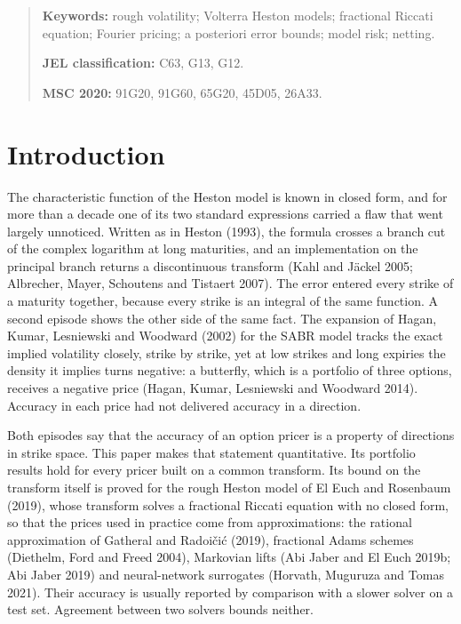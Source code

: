 \documentclass[11pt,a4paper]{article}
\begin{document}
\vspace{0.4em}

\begin{quote}\small\noindent\textbf{Keywords:} rough volatility; Volterra Heston models; fractional Riccati equation; Fourier pricing; a posteriori error bounds; model risk; netting.\par\smallskip\noindent\textbf{JEL classification:} C63, G13, G12.\par\smallskip\noindent\textbf{MSC 2020:} 91G20, 91G60, 65G20, 45D05, 26A33.\end{quote}

\newpage

\setcounter{footnote}{0}

\setcounter{section}{0}\section{Introduction}

The characteristic function of the Heston model is known in closed form, and for more than a decade one of its two standard expressions carried a flaw that went largely unnoticed. Written as in Heston (1993), the formula crosses a branch cut of the complex logarithm at long maturities, and an implementation on the principal branch returns a discontinuous transform (Kahl and Jäckel 2005; Albrecher, Mayer, Schoutens and Tistaert 2007). The error entered every strike of a maturity together, because every strike is an integral of the same function. A second episode shows the other side of the same fact. The expansion of Hagan, Kumar, Lesniewski and Woodward (2002) for the SABR model tracks the exact implied volatility closely, strike by strike, yet at low strikes and long expiries the density it implies turns negative: a butterfly, which is a portfolio of three options, receives a negative price (Hagan, Kumar, Lesniewski and Woodward 2014). Accuracy in each price had not delivered accuracy in a direction.

Both episodes say that the accuracy of an option pricer is a property of directions in strike space. This paper makes that statement quantitative. Its portfolio results hold for every pricer built on a common transform. Its bound on the transform itself is proved for the rough Heston model of El Euch and Rosenbaum (2019), whose transform solves a fractional Riccati equation with no closed form, so that the prices used in practice come from approximations: the rational approximation of Gatheral and Radoičić (2019), fractional Adams schemes (Diethelm, Ford and Freed 2004), Markovian lifts (Abi Jaber and El Euch 2019b; Abi Jaber 2019) and neural-network surrogates (Horvath, Muguruza and Tomas 2021). Their accuracy is usually reported by comparison with a slower solver on a test set. Agreement between two solvers bounds neither.
\end{document}
